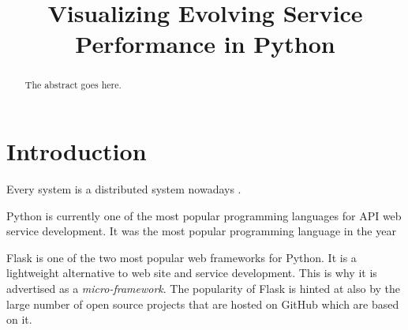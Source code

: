 \documentclass[conference]{IEEEtran}
\begin{document}
%
\title{Visualizing Evolving Service Performance in Python }


\author{
\and
{}
\and
{}
}



\maketitle

\begin{abstract}
The abstract goes here.
\end{abstract}


\IEEEpeerreviewmaketitle



\section{Introduction}
Every system is a distributed system nowadays \cite{}. 

 

Python is currently one of the most popular programming languages for API web service development. It was the  most popular programming language in the year 

Flask is one of the two most popular web frameworks for Python. It is a lightweight alternative to web site and service development. This is why it is advertised as a {\em micro-framework}. The popularity of Flask is hinted at also by the large number  of open source projects that are hosted on GitHub which are based on it. 
\end{document}
